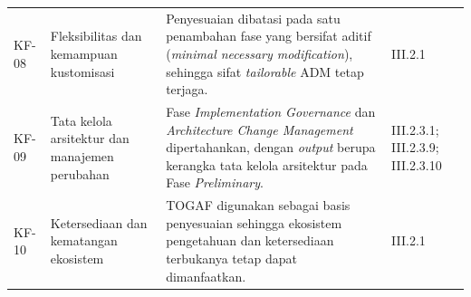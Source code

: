 \begin{longtable}{@{}p{}p{}p{}p{}@{}}
\addlinespace
KF-08 & Fleksibilitas dan kemampuan kustomisasi & Penyesuaian dibatasi pada satu penambahan fase yang bersifat aditif (\textit{minimal necessary modification}), sehingga sifat \textit{tailorable} ADM tetap terjaga. & III.2.1\\
\addlinespace
KF-09 & Tata kelola arsitektur dan manajemen perubahan & Fase \textit{Implementation Governance} dan \textit{Architecture Change Management} dipertahankan, dengan \textit{output} berupa kerangka tata kelola arsitektur pada Fase \textit{Preliminary}. & III.2.3.1; III.2.3.9; III.2.3.10\\
\addlinespace
KF-10 & Ketersediaan dan kematangan ekosistem & TOGAF digunakan sebagai basis penyesuaian sehingga ekosistem pengetahuan dan ketersediaan terbukanya tetap dapat dimanfaatkan. & III.2.1\\
\end{longtable}